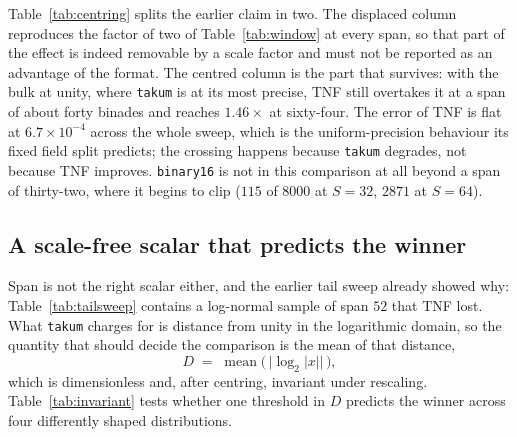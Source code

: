 Table~\ref{tab:centring} splits the earlier claim in two. The displaced column
reproduces the factor of two of Table~\ref{tab:window} at every span, so that part
of the effect is indeed removable by a scale factor and must not be reported as an
advantage of the format. The centred column is the part that survives: with the
bulk at unity, where \texttt{takum} is at its most precise, TNF still overtakes it
at a span of about forty binades and reaches $1.46\times$ at sixty-four. The
error of TNF is flat at $6.7\times 10^{-4}$ across the whole sweep, which is the
uniform-precision behaviour its fixed field split predicts; the crossing happens
because \texttt{takum} degrades, not because TNF improves. \texttt{binary16} is
not in this comparison at all beyond a span of thirty-two, where it begins to clip
($115$ of $8000$ at $S=32$, $2871$ at $S=64$).

\subsection{A scale-free scalar that predicts the winner}
\label{sec:invariant}

Span is not the right scalar either, and the earlier tail sweep already showed why:
Table~\ref{tab:tailsweep} contains a log-normal sample of span $52$ that TNF lost.
What \texttt{takum} charges for is distance from unity in the logarithmic domain,
so the quantity that should decide the comparison is the mean of that distance,
\[
  D \;=\; \operatorname{mean}\bigl(\,\bigl\lvert \log_2 |x| \bigr\rvert\,\bigr),
\]
which is dimensionless and, after centring, invariant under rescaling.
Table~\ref{tab:invariant} tests whether one threshold in $D$ predicts the winner
across four differently shaped distributions.

